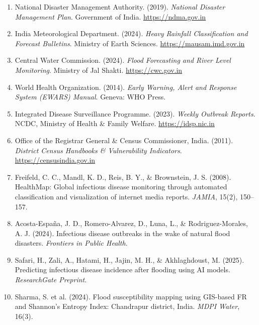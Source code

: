\documentclass[12pt,a4paper]{report}
\begin{document}
\begin{enumerate}[noitemsep]
  \item National Disaster Management Authority. (2019). \textit{National Disaster Management Plan}. Government of India. \url{https://ndma.gov.in}

  \item India Meteorological Department. (2024). \textit{Heavy Rainfall Classification and Forecast Bulletins}. Ministry of Earth Sciences. \url{https://mausam.imd.gov.in}

  \item Central Water Commission. (2024). \textit{Flood Forecasting and River Level Monitoring}. Ministry of Jal Shakti. \url{https://cwc.gov.in}

  \item World Health Organization. (2014). \textit{Early Warning, Alert and Response System (EWARS) Manual}. Geneva: WHO Press.

  \item Integrated Disease Surveillance Programme. (2023). \textit{Weekly Outbreak Reports}. NCDC, Ministry of Health \& Family Welfare. \url{https://idsp.nic.in}

  \item Office of the Registrar General \& Census Commissioner, India. (2011). \textit{District Census Handbooks \& Vulnerability Indicators}. \url{https://censusindia.gov.in}

  \item Freifeld, C. C., Mandl, K. D., Reis, B. Y., \& Brownstein, J. S. (2008). HealthMap: Global infectious disease monitoring through automated classification and visualization of internet media reports. \textit{JAMIA}, 15(2), 150--157.

  \item Acosta-España, J. D., Romero-Alvarez, D., Luna, L., \& Rodriguez-Morales, A. J. (2024). Infectious disease outbreaks in the wake of natural flood disasters. \textit{Frontiers in Public Health}.

  \item Safari, H., Zali, A., Hatami, H., Jajin, M. H., \& Akhlaghdoust, M. (2025). Predicting infectious disease incidence after flooding using AI models. \textit{ResearchGate Preprint}.

  \item Sharma, S. et al. (2024). Flood susceptibility mapping using GIS-based FR and Shannon's Entropy Index: Chandrapur district, India. \textit{MDPI Water}, 16(3).


\end{enumerate}
\end{document}
